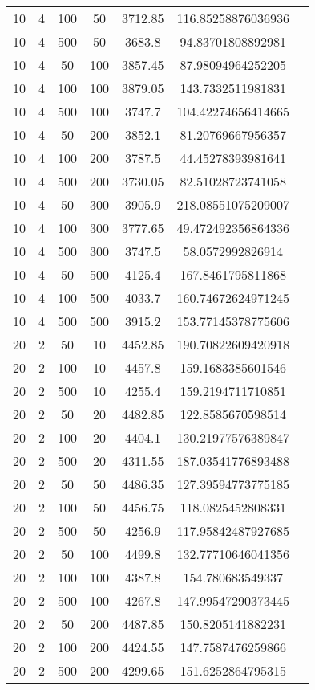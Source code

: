 {\begin{longtabu}{S
S
S
S
S
S[round-mode=places,round-precision=0]
S[round-mode=places,round-precision=0]}
10 & 4 & 100 & 50 & 3712.85 & 116.85258876036936 \\
10 & 4 & 500 & 50 & 3683.8 & 94.83701808892981 \\
10 & 4 & 50 & 100 & 3857.45 & 87.98094964252205 \\
10 & 4 & 100 & 100 & 3879.05 & 143.7332511981831 \\
10 & 4 & 500 & 100 & 3747.7 & 104.42274656414665 \\
10 & 4 & 50 & 200 & 3852.1 & 81.20769667956357 \\
10 & 4 & 100 & 200 & 3787.5 & 44.45278393981641 \\
10 & 4 & 500 & 200 & 3730.05 & 82.51028723741058 \\
10 & 4 & 50 & 300 & 3905.9 & 218.08551075209007 \\
10 & 4 & 100 & 300 & 3777.65 & 49.472492356864336 \\
10 & 4 & 500 & 300 & 3747.5 & 58.0572992826914 \\
10 & 4 & 50 & 500 & 4125.4 & 167.8461795811868 \\
10 & 4 & 100 & 500 & 4033.7 & 160.74672624971245 \\
10 & 4 & 500 & 500 & 3915.2 & 153.77145378775606 \\
20 & 2 & 50 & 10 & 4452.85 & 190.70822609420918 \\
20 & 2 & 100 & 10 & 4457.8 & 159.1683385601546 \\
20 & 2 & 500 & 10 & 4255.4 & 159.2194711710851 \\
20 & 2 & 50 & 20 & 4482.85 & 122.8585670598514 \\
20 & 2 & 100 & 20 & 4404.1 & 130.21977576389847 \\
20 & 2 & 500 & 20 & 4311.55 & 187.03541776893488 \\
20 & 2 & 50 & 50 & 4486.35 & 127.39594773775185 \\
20 & 2 & 100 & 50 & 4456.75 & 118.0825452808331 \\
20 & 2 & 500 & 50 & 4256.9 & 117.95842487927685 \\
20 & 2 & 50 & 100 & 4499.8 & 132.77710646041356 \\
20 & 2 & 100 & 100 & 4387.8 & 154.780683549337 \\
20 & 2 & 500 & 100 & 4267.8 & 147.99547290373445 \\
20 & 2 & 50 & 200 & 4487.85 & 150.8205141882231 \\
20 & 2 & 100 & 200 & 4424.55 & 147.7587476259866 \\
20 & 2 & 500 & 200 & 4299.65 & 151.6252864795315 \\

\end{longtabu}}
